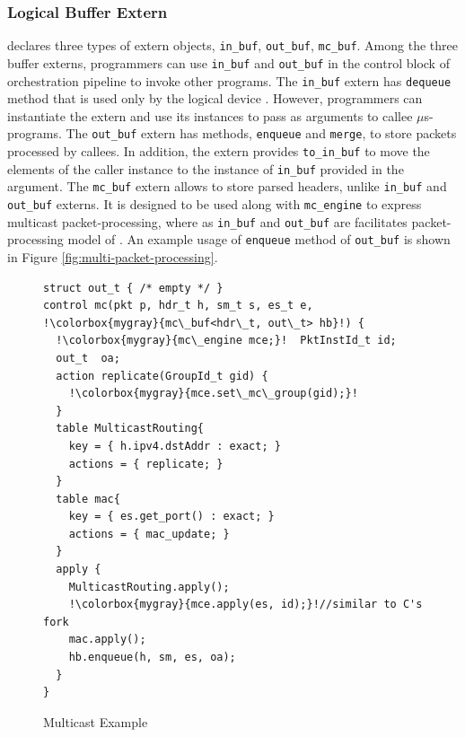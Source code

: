 \documentclass[letterpaper,twocolumn,10pt]{article}
\begin{document}
\subsubsection{Logical Buffer Extern}
\label{sec:logical}
\uarch declares three types of extern objects, \texttt{in\_buf}, \texttt{out\_buf}, \texttt{mc\_buf}.
Among the three buffer externs, programmers can use \texttt{in\_buf} and \texttt{out\_buf} in the control block of orchestration pipeline to invoke other programs.
The \texttt{in\_buf} extern has \texttt{dequeue} method that is used only by the logical device \ulang. 
However, programmers can instantiate the extern and use its instances to pass as arguments to callee $\mu$s-programs.
The \texttt{out\_buf} extern has methods, \texttt{enqueue} and \texttt{merge}, to store packets processed by callees.
In addition, the extern provides \texttt{to\_in\_buf} to move the elements of the caller instance to the instance of \texttt{in\_buf} provided in the argument.
The \texttt{mc\_buf} extern allows to store parsed headers, unlike \texttt{in\_buf} and \texttt{out\_buf} externs.
It is designed to  be used along with \texttt{mc\_engine} to express multicast packet-processing, where as \texttt{in\_buf} and \texttt{out\_buf} are facilitates packet-processing model of \ulang.
An example usage of \texttt{enqueue} method of \texttt{out\_buf} is shown in Figure \ref{fig:multi-packet-processing}.

\begin{figure}[h]
\begin{lstlisting}[frame=none, escapechar=!]
struct out_t { /* empty */ }
control mc(pkt p, hdr_t h, sm_t s, es_t e, !\colorbox{mygray}{mc\_buf<hdr\_t, out\_t> hb}!) {
  !\colorbox{mygray}{mc\_engine mce;}!  PktInstId_t id; 
  out_t  oa;
  action replicate(GroupId_t gid) {
    !\colorbox{mygray}{mce.set\_mc\_group(gid);}!
  }
  table MulticastRouting{
    key = { h.ipv4.dstAddr : exact; } 
    actions = { replicate; }
  }
  table mac{
    key = { es.get_port() : exact; } 
    actions = { mac_update; }
  }
  apply {
    MulticastRouting.apply();
    !\colorbox{mygray}{mce.apply(es, id);}!//similar to C's fork
    mac.apply();
    hb.enqueue(h, sm, es, oa);
  }
}
\end{lstlisting}
\caption{Multicast Example}
\label{fig:multicast-example}
\end{figure}
\end{document}
